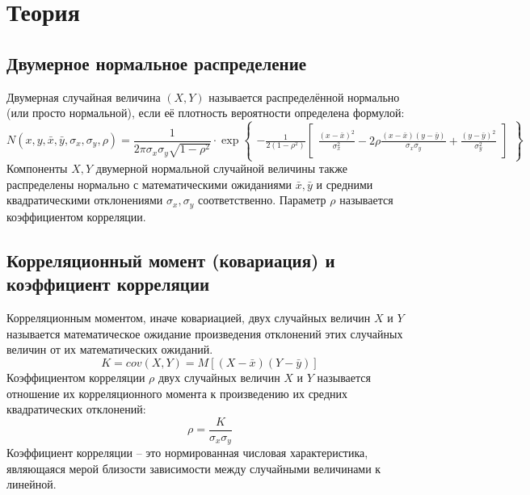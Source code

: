 \documentclass[main.tex]{subfiles}
\begin{document}
  
\section{Теория}

\subsection{Двумерное нормальное распределение}
Двумерная случайная величина $(X, Y)$ называется распределённой нормально (или просто нормальной), если её плотность вероятности определена формулой:
\begin{equation}
	N(x, y, \bar{x}, \bar{y}, \sigma_x, \sigma_y, \rho) = 
	\dfrac{1}{2 \pi \sigma_x \sigma_y \sqrt{1 - \rho^2}} \cdot 
	\exp{\begin{Bmatrix}
			-\frac{1}{2 (1 - \rho^2)}
			\begin{bmatrix}
				\frac{(x - \bar{x})^2}{\sigma_{x}^2} 
				- 2 \rho \frac{(x - \bar{x})(y - \bar{y})}{\sigma_x \sigma_y} 
				+ \frac{(y - \bar{y})^2}{\sigma_{y}^2}
			\end{bmatrix}
		\end{Bmatrix}}
\end{equation}
Компоненты $X, Y$ двумерной нормальной случайной величины также распределены нормально с математическими ожиданиями $\bar{x}, \bar{y}$ и средними квадратическими отклонениями $\sigma_{x}, \sigma_{y}$ соответственно. Параметр $\rho$ называется коэффициентом корреляции.

\subsection{Корреляционный момент (ковариация) и коэффициент корреляции}
Корреляционным моментом, иначе ковариацией, двух случайных величин $X \text{ и } Y$ называется математическое ожидание произведения отклонений этих случайных величин от их математических ожиданий.
\begin{equation}
	K = cov(X, Y) = M[(X - \bar{x})(Y - \bar{y})]
\end{equation}
Коэффициентом корреляции $\rho$ двух случайных величин $X \text{ и } Y$ называется отношение их корреляционного момента к произведению их средних квадратических отклонений:
\begin{equation}
	\rho = \dfrac{K}{\sigma_{x} \sigma_{y}}
\end{equation}
Коэффициент корреляции -- это нормированная числовая характеристика, являющаяся мерой близости зависимости между случайными величинами к линейной.
\end{document}
